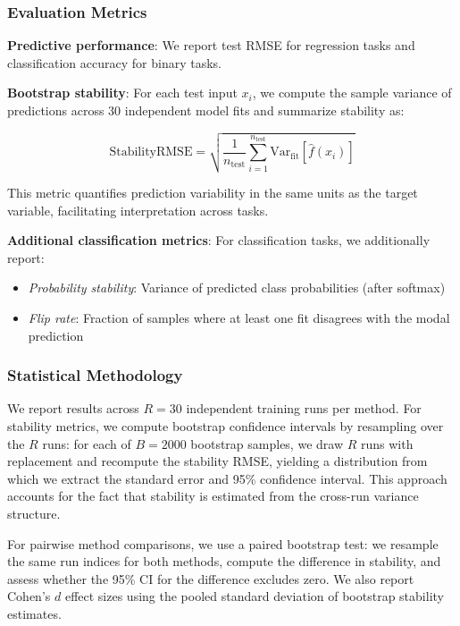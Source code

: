 \documentclass[12pt, letterpaper]{article}
\begin{document}
\subsubsection{Evaluation Metrics}

\textbf{Predictive performance}: We report test RMSE for regression tasks and classification accuracy for binary tasks.

\textbf{Bootstrap stability}: For each test input $x_i$, we compute the sample variance of predictions across 30 independent model fits and summarize stability as:

\begin{equation}
\text{StabilityRMSE} = \sqrt{\frac{1}{n_{\text{test}}}\sum_{i=1}^{n_{\text{test}}} \text{Var}_{\text{fit}}[\hat{f}(x_i)]}
\end{equation}

This metric quantifies prediction variability in the same units as the target variable, facilitating interpretation across tasks.

\textbf{Additional classification metrics}: For classification tasks, we additionally report:
\begin{itemize}
\item \emph{Probability stability}: Variance of predicted class probabilities (after softmax)
\item \emph{Flip rate}: Fraction of samples where at least one fit disagrees with the modal prediction
\end{itemize}

\subsubsection{Statistical Methodology}

We report results across $R=30$ independent training runs per method. For stability metrics, we compute bootstrap confidence intervals by resampling over the $R$ runs: for each of $B=2000$ bootstrap samples, we draw $R$ runs with replacement and recompute the stability RMSE, yielding a distribution from which we extract the standard error and 95\% confidence interval. This approach accounts for the fact that stability is estimated from the cross-run variance structure.

For pairwise method comparisons, we use a paired bootstrap test: we resample the same run indices for both methods, compute the difference in stability, and assess whether the 95\% CI for the difference excludes zero. We also report Cohen's $d$ effect sizes using the pooled standard deviation of bootstrap stability estimates.
\end{document}
